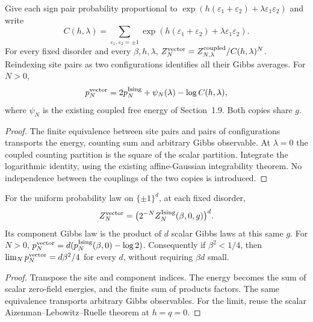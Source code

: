 \begin{theorem}\label{thm:sg-tal:vector-coupled}
\leanok
Give each sign pair probability proportional to
$\exp(h(\varepsilon_1+\varepsilon_2)+\lambda\varepsilon_1\varepsilon_2)$ and write
\[
 C(h,\lambda)=\sum_{\varepsilon_1,\varepsilon_2=\pm1}
   \exp(h(\varepsilon_1+\varepsilon_2)+\lambda\varepsilon_1\varepsilon_2).
\]
For every fixed disorder and every $\beta,h,\lambda$,
$Z_N^{\rm vector}=Z_{N,\lambda}^{\rm coupled}/C(h,\lambda)^N$.
Reindexing site pairs as two configurations identifies all their Gibbs averages.
For $N>0$,
\[
 p_N^{\rm vector}=2p_N^{\rm Ising}+\psi_N(\lambda)-\log C(h,\lambda),
\]
where $\psi_N$ is the existing coupled free energy of Section~1.9. Both copies share $g$.
\end{theorem}
\begin{proof}
The finite equivalence between site pairs and pairs of configurations transports the
energy, counting sum and arbitrary Gibbs observable. At $\lambda=0$ the coupled counting
partition is the square of the scalar partition. Integrate the logarithmic identity,
using the existing affine-Gaussian integrability theorem. No independence between the
couplings of the two copies is introduced.
\end{proof}

\begin{theorem}\label{thm:sg-tal:vector-hypercube}
\leanok
For the uniform probability law on $\{\pm1\}^d$, at each fixed disorder,
\[
 Z_N^{\rm vector}=\bigl(2^{-N}Z_N^{\rm Ising}(\beta,0,g)\bigr)^d.
\]
Its component Gibbs law is the product of $d$ scalar Gibbs laws at this same $g$.
For $N>0$, $p_N^{\rm vector}=d(p_N^{\rm Ising}(\beta,0)-\log2)$.
Consequently if $\beta^2<1/4$, then
$\lim_N p_N^{\rm vector}=d\beta^2/4$ for every $d$, without requiring $\beta d$ small.
\end{theorem}
\begin{proof}
Transpose the site and component indices. The energy becomes the sum of scalar
zero-field energies, and the finite sum of products factors. The same equivalence
transports arbitrary Gibbs observables. For the limit, reuse the scalar
Aizenman--Lebowitz--Ruelle theorem at $h=q=0$.
\end{proof}

